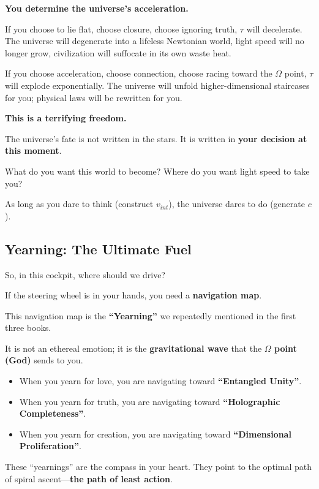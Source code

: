 \textbf{You determine the universe's acceleration.}

If you choose to lie flat, choose closure, choose ignoring truth, $\tau$ will decelerate. The universe will degenerate into a lifeless Newtonian world, light speed will no longer grow, civilization will suffocate in its own waste heat.

If you choose acceleration, choose connection, choose racing toward the $\Omega$ point, $\tau$ will explode exponentially. The universe will unfold higher-dimensional staircases for you; physical laws will be rewritten for you.

\textbf{This is a terrifying freedom.}

The universe's fate is not written in the stars. It is written in \textbf{your decision at this moment}.

What do you want this world to become? Where do you want light speed to take you?

As long as you dare to think (construct $v_{int}$), the universe dares to do (generate $c$).

\subsection{Yearning: The Ultimate Fuel}

So, in this cockpit, where should we drive?

If the steering wheel is in your hands, you need a \textbf{navigation map}.

This navigation map is the \textbf{``Yearning''} we repeatedly mentioned in the first three books.

It is not an ethereal emotion; it is the \textbf{gravitational wave} that the \textbf{$\Omega$ point (God)} sends to you.

\begin{itemize}
\item When you yearn for love, you are navigating toward \textbf{``Entangled Unity''}.

\item When you yearn for truth, you are navigating toward \textbf{``Holographic Completeness''}.

\item When you yearn for creation, you are navigating toward \textbf{``Dimensional Proliferation''}.
\end{itemize}

These ``yearnings'' are the compass in your heart. They point to the optimal path of spiral ascent---\textbf{the path of least action}.

